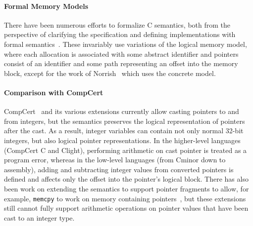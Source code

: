 \paragraph{Formal Memory Models}
There have been numerous efforts to formalize C semantics, both from
the perspective of clarifying the specification and defining
implementations with formal semantics~\cite{norrish1998c,leroy:compcert,ellison2012executable,krebbers2011formalization,Greenaway:2014:DSS:2594291.2594296}. These invariably use
variations of the logical memory model, where each allocation is
associated with some abstract identifier and pointers consist of
an identifier and some path representing an offset into the memory
block, except for the work of Norrish~\cite{norrish1998c} which uses the concrete model.

\paragraph{Comparison with CompCert}
CompCert~\cite{leroy:compcert,Leroy-Appel-Blazy-Stewart-memory-v2} and its various extensions
currently allow casting pointers to and from integers, but the
semantics preserves the logical representation of pointers after the cast. 
As a result, integer variables can contain not only normal 32-bit integers,
but also logical pointer representations.
In the higher-level languages (CompCert C and Clight), performing arithmetic
on cast pointer is treated as a program error, whereas in the low-level languages
(from Cminor down to assembly), adding and subtracting integer values 
from converted pointers is defined and affects only the offset into the pointer's 
logical block. There
has also been work on extending the semantics to support pointer
fragments to allow, for example, \texttt{memcpy} to work on memory
containing pointers~\cite{krebbers2014formal}, but these extensions still cannot fully 
support arithmetic operations on pointer values that have been cast
to an integer type.

